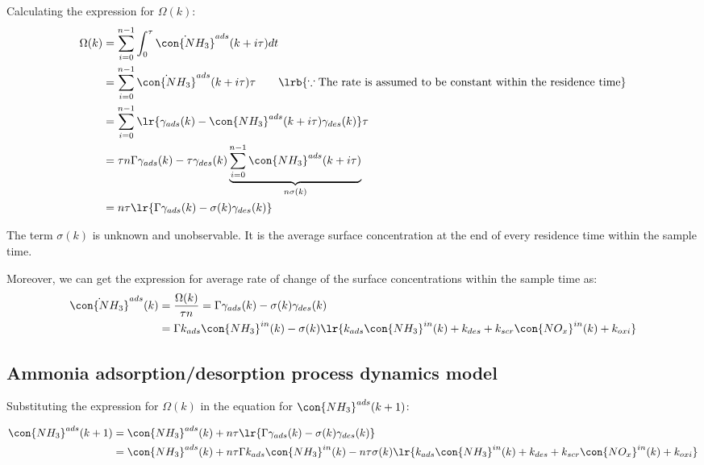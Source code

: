 Calculating the expression for $\Omega(k)$:
\begin{align*}
    \Omega(k) &= \sum_{i=0}^{n-1} \int_{0}^{\tau} \dot{\con{NH_3}}^{ads} (k + i\tau) dt\\
    &= \sum_{i=0}^{n-1} \dot{\con{NH_3}}^{ads} (k + i\tau) \tau \qquad \lrb{\because \text{The rate is assumed to be constant within the residence time}}\\
    &= \sum_{i=0}^{n-1} \lr{\gamma_{ads} (k) - \con{NH_3}^{ads} (k + i \tau) \gamma_{des} (k)} \tau\\
    &= \tau n \Gamma \gamma_{ads} (k) - \tau \gamma_{des} (k) \underbrace{\sum_{i=0}^{n-1} \con{NH_3}^{ads} (k + i \tau) }_{n \sigma(k)} \\
    &= n \tau \lr{\Gamma \gamma_{ads} (k) - \sigma(k) \gamma_{des} (k)}
\end{align*}

The term $\sigma(k)$ is unknown and unobservable. It is the average surface
concentration at the end of every residence time within the sample time.

Moreover, we can get the expression for average rate of change of the surface
concentrations within the sample time as:
\begin{align*}
    \dot{\con{NH_3}}^{ads} (k) &= \frac{\Omega(k)}{\tau n} = \Gamma \gamma_{ads} (k) - \sigma(k) \gamma_{des} (k)\\
    &= \Gamma k_{ads} \con{NH_3}^{in}(k) - \sigma(k) \lr{k_{ads} \con{NH_3}^{in}(k) + k_{des} + k_{scr} \con{NO_x}^{in}(k) + k_{oxi}}
\end{align*}


\subsection{Ammonia adsorption/desorption process dynamics model}
Substituting the expression for $\Omega(k)$ in the equation for
$\con{NH_3}^{ads}(k + 1)$:

\begin{align*}
    \con{NH_3}^{ads}(k + 1) &= \con{NH_3}^{ads} (k) + n \tau \lr{\Gamma \gamma_{ads} (k) - \sigma(k) \gamma_{des} (k)}\\
    &= \con{NH_3}^{ads}(k) + n \tau \Gamma k_{ads} \con{NH_3}^{in}(k) - n \tau \sigma(k) \lr{k_{ads} \con{NH_3}^{in}(k) + k_{des} + k_{scr} \con{NO_x}^{in}(k) + k_{oxi}}
\end{align*}

% 
